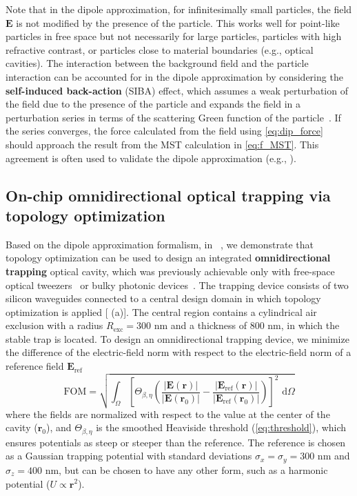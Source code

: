 Note that in the dipole approximation, for infinitesimally small particles, the field $\mathbf{E}$ is not modified by the presence of the particle.
This works well for point-like particles in free space but not necessarily 
for large particles, particles with high refractive contrast, or particles close to material
boundaries (e.g., optical cavities). The interaction between the background field and the particle interaction can be accounted for in the dipole
approximation by considering the \textbf{self-induced back-action} (SIBA) effect, which assumes a weak
perturbation of the field due to the presence of the particle and expands the field in a perturbation series in terms of 
the scattering Green function of the particle~\cite{novotny, SIBA, benjamin}. If the series converges, the force calculated from the field 
using \eqref{eq:dip_force} should approach the result from the MST calculation in \eqref{eq:f_MST}. 
This agreement is often used to validate the dipole approximation (e.g., \cite{ownpub1,ownpub3}).

\subsection*{On-chip omnidirectional optical trapping via topology optimization~\cite{ownpub1}}

Based on the dipole approximation formalism, in ~\cite{ownpub1}, we demonstrate that topology optimization can be used to design an integrated \textbf{omnidirectional trapping} optical cavity, which was previously achievable only with free-space optical tweezers~\cite{ashkin_acceleration_1970} or bulky photonic devices~\cite{manka_simulation_2024}. The trapping device
consists of two silicon waveguides connected to a central design domain in which
topology optimization is applied [ (a)]. The central region contains a cylindrical air exclusion with a radius
$R_\text{exc}=300$ nm and a thickness of $800$ nm, in which the stable trap is located.
To design an omnidirectional trapping device, we minimize  
the difference of the electric-field norm with respect to the electric-field norm of a reference field $\mathbf{E}_\text{ref}$
\begin{equation}
 \text{FOM} =\sqrt{\int_{\Omega}\left[\Theta_{\beta,\eta}\left(\frac{|\mathbf{E}(\mathbf{r})|}{\left|\mathbf{E}\left(\mathbf{r}_0\right)\right|}-\frac{\left|\mathbf{E}_{\text{ref}}(\mathbf{r})\right|}{\left|\mathbf{E}_{\text{ref}}\left(\mathbf{r}_0\right)\right|}\right)\right]^2 \text{~d} \Omega}
    \end{equation}
where the fields are normalized with respect to the value at the center of the cavity ($\mathbf{r}_0$), and $\Theta_{\beta,\eta}$ is the smoothed Heaviside threshold (\eqref{eq:threshold}), which ensures
potentials as steep or steeper than the reference. The reference is chosen as a Gaussian trapping potential with standard deviations $\sigma_x=\sigma_y=300$ nm and $\sigma_z=400$ nm, but can be chosen to have any other form, such as a harmonic potential ($U\propto\mathbf{r}^2$).

